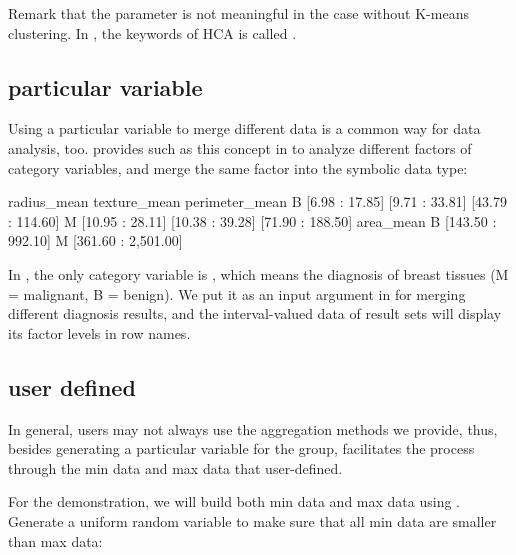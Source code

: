 \documentclass[article]{jss}
\begin{document}
Remark that the  parameter is not meaningful in the case without K-means clustering. In , the keywords of HCA is called .

\subsection{particular variable}

Using a particular variable to merge different data is a common way for data analysis, too.  provides such as this concept in  to analyze different factors of category variables, and merge the same factor into the symbolic data type:

\begin{Schunk}
\begin{Soutput}
      radius_mean    texture_mean   perimeter_mean
B  [6.98 : 17.85]  [9.71 : 33.81] [43.79 : 114.60]
M [10.95 : 28.11] [10.38 : 39.28] [71.90 : 188.50]
            area_mean
B   [143.50 : 992.10]
M [361.60 : 2,501.00]
\end{Soutput}
\end{Schunk}

In , the only category variable is , which means the diagnosis of breast tissues (M = malignant, B = benign). We put it as an input argument in  for merging different diagnosis results, and the interval-valued data of result sets will display its factor levels in row names.


\subsection{user defined}\label{sec:userDef}

In general, users may not always use the aggregation methods we provide, thus, besides generating a particular variable for the group,  facilitates the process through the min data and max data that user-defined.

For the demonstration, we will build both min data and max data using . Generate a uniform random variable to make sure that all min data are smaller than max data:
\end{document}
